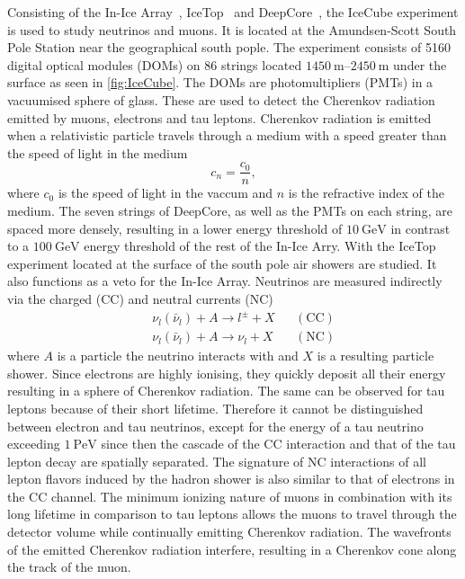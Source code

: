 Consisting of the In-Ice Array~\cite{In-Ice}, IceTop~\cite{IceTop} and DeepCore~\cite{DeepCore}, the IceCube experiment is used to study neutrinos and muons. It is located at the Amundsen-Scott South Pole Station near the geographical south pople. The experiment consists of 5160 digital optical modules (DOMs) on 86 strings located $\SIrange{1450}{2450}{\metre}$ under the surface as seen in \autoref{fig:IceCube}. The DOMs are photomultipliers (PMTs) in a vacuumised sphere of glass. These are used to detect the Cherenkov radiation emitted by muons, electrons and tau leptons. Cherenkov radiation is emitted when a relativistic particle travels through a medium with a speed greater than the speed of light in the medium
\begin{equation*}
  c_n = \frac{c_0}{n},
\end{equation*}
where $c_0$ is the speed of light in the vaccum and $n$ is the refractive index of the medium.
The seven strings of DeepCore, as well as the PMTs on each string, are spaced more densely, resulting in a lower energy threshold of $\SI{10}{\giga\electronvolt}$ in contrast to a $\SI{100}{\giga\electronvolt}$ energy threshold of the rest of the In-Ice Arry. With the IceTop experiment located at the surface of the south pole air showers are studied. It also functions as a veto for the In-Ice Array.
Neutrinos are measured indirectly via the charged (CC) and neutral currents (NC)
\begin{align*}
&&  \nu_l(\bar{\nu}_l) + A \to l^{\pm} + X && \mathrm{(CC)}\\
&&  \nu_l(\bar{\nu}_l) + A \to \nu_l + X && \mathrm{(NC)}
\end{align*}
where $A$ is a particle the neutrino interacts with and $X$ is a resulting particle shower. Since electrons are highly ionising, they quickly deposit all their energy resulting in a sphere of Cherenkov radiation. The same can be observed for tau leptons because of their short lifetime. Therefore it cannot be distinguished between electron and tau neutrinos, except for the energy of a tau neutrino exceeding $\SI{1}{\peta\electronvolt}$ since then the cascade of the CC interaction and that of the tau lepton decay are spatially separated.
The signature of NC interactions of all lepton flavors induced by the hadron shower is also similar to that of electrons in the CC channel.
The minimum ionizing nature of muons in combination with its long lifetime in comparison to tau leptons allows the muons to travel through the detector volume while continually emitting Cherenkov radiation. The wavefronts of the emitted Cherenkov radiation interfere, resulting in a Cherenkov cone along the track of the muon.\\

